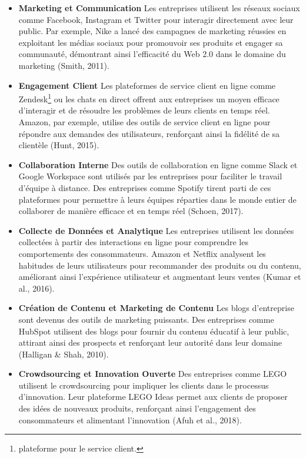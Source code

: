 \documentclass[12pt,a4paper]{article} %
\begin{document}
			\begin{itemize}
				\item {\textbf{Marketing et Communication}}
	Les entreprises utilisent les réseaux sociaux comme Facebook, Instagram et Twitter pour interagir directement avec leur public. Par exemple, Nike a lancé des campagnes de marketing réussies en exploitant les médias sociaux pour promouvoir ses produits et engager sa communauté, démontrant ainsi l'efficacité du Web 2.0 dans le domaine du marketing (Smith, 2011).
		\item {\textbf{Engagement Client}}
	Les plateformes de service client en ligne comme Zendesk\footnote[7]{plateforme pour le service client.} ou les chats en direct offrent aux entreprises un moyen efficace d'interagir et de résoudre les problèmes de leurs clients en temps réel. Amazon, par exemple, utilise des outils de service client en ligne pour répondre aux demandes des utilisateurs, renforçant ainsi la fidélité de sa clientèle (Hunt, 2015).
	\item {\textbf{Collaboration Interne}}
	Des outils de collaboration en ligne comme Slack et Google Workspace sont utilisés par les entreprises pour faciliter le travail d'équipe à distance. Des entreprises comme Spotify tirent parti de ces plateformes pour permettre à leurs équipes réparties dans le monde entier de collaborer de manière efficace et en temps réel (Schoen, 2017).
	\item {\textbf{Collecte de Données et Analytique}}
	Les entreprises utilisent les données collectées à partir des interactions en ligne pour comprendre les comportements des consommateurs. Amazon et Netflix analysent les habitudes de leurs utilisateurs pour recommander des produits ou du contenu, améliorant ainsi l'expérience utilisateur et augmentant leurs ventes (Kumar et al., 2016).
	\item \textbf{Création de Contenu et Marketing de Contenu}
	Les blogs d'entreprise sont devenus des outils de marketing puissants. Des entreprises comme HubSpot utilisent des blogs pour fournir du contenu éducatif à leur public, attirant ainsi des prospects et renforçant leur autorité dans leur domaine (Halligan & Shah, 2010).
	\item {\textbf{Crowdsourcing et Innovation Ouverte}}
	Des entreprises comme LEGO utilisent le crowdsourcing pour impliquer les clients dans le processus d'innovation. Leur plateforme LEGO Ideas permet aux clients de proposer des idées de nouveaux produits, renforçant ainsi l'engagement des consommateurs et alimentant l'innovation (Afuh et al., 2018).

\end{itemize}
\end{document}

